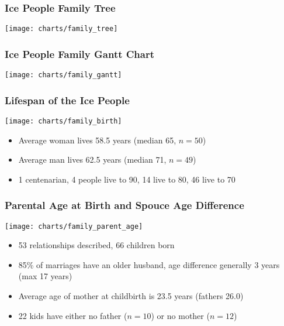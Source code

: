 \begin{frame}
    \frametitle{Ice People Family Tree}
    \centering
    \texttt{[image: charts/family\_tree]}
\end{frame}

\begin{frame}
    \frametitle{Ice People Family Gantt Chart}
    \centering
    \texttt{[image: charts/family\_gantt]}
\end{frame}

\begin{frame}
    \frametitle{Lifespan of the Ice People}
    \texttt{[image: charts/family\_birth]}
    \begin{itemize}
        \item Average woman lives 58.5 years (median 65, $n=50$)
        \item Average man lives 62.5 years (median 71, $n=49$)
        \item 1 centenarian, 4 people live to 90, 14 live to 80, 46 live to 70
    \end{itemize}
\end{frame}

\begin{frame}
    \frametitle{Parental Age at Birth and Spouce Age Difference}
    \texttt{[image: charts/family\_parent\_age]}
    \begin{itemize}
        \item 53 relationships described, 66 children born
        \item 85\% of marriages have an older husband, age difference generally 3 years (max 17 years)
        \item Average age of mother at childbirth is 23.5 years (fathers 26.0)
        \item 22 kids have either no father ($n=10$) or no mother ($n=12$)
    \end{itemize}
\end{frame}
